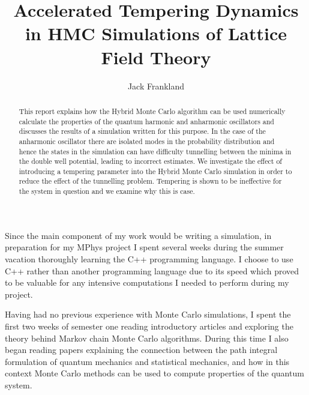 \documentclass[12pt]{article}
\begin{document}
\title{Accelerated Tempering Dynamics in HMC Simulations of Lattice Field Theory} %
\author{Jack Frankland} %

\begin{abstract}
    This report explains how the Hybrid Monte Carlo algorithm can be used numerically calculate the properties of the quantum harmonic and anharmonic oscillators and discusses the results of a simulation written for this purpose. In the case of the anharmonic oscillator there are isolated modes in the probability distribution and hence the states in the simulation can have difficulty tunnelling between the minima in the double well potential, leading to incorrect estimates. We investigate the effect of introducing a tempering parameter into the Hybrid Monte Carlo simulation in order to reduce the effect of the tunnelling problem. Tempering is shown to be ineffective for the system in question and we examine why this is case.
    
\end{abstract}

\maketitle

\personalstatement
    Since the main component of my work would be writing a simulation, in preparation for my MPhys project I spent several weeks during the summer vacation thoroughly learning the C++ programming language. I choose to use C++ rather than another programming language due to its speed which proved to be valuable for any intensive computations I needed to perform during my project.

    Having had no previous experience with Monte Carlo simulations, I spent the first two weeks of semester one reading introductory articles and exploring the theory behind Markov chain Monte Carlo algorithms. During this time I also began reading papers explaining the connection between the path integral formulation of quantum mechanics and statistical mechanics, and how in this context Monte Carlo methods can be used to compute properties of the quantum system.
\end{document}
